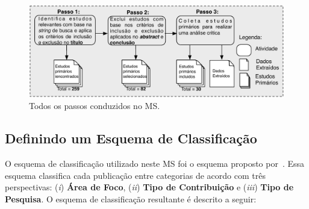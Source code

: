 \begin{figure}[h]
 \caption{Todos os passos conduzidos no MS.}
 \label{fig:todos_os_passos}
 \centering
 \includegraphics[scale=0.7]{images/todosOsPassosMS}
 \fautor
\end{figure}

\subsection{Definindo um Esquema de Classificação}

O esquema de classificação utilizado neste MS foi o esquema proposto por~. Essa esquema classifica cada publicação entre categorias de acordo com três perspectivas: (\textit{i}) \textbf{Área de Foco}, (\textit{ii}) \textbf{Tipo de Contribuição} e (\textit{iii}) \textbf{Tipo de Pesquisa}. O esquema de classificação resultante é descrito a seguir:


